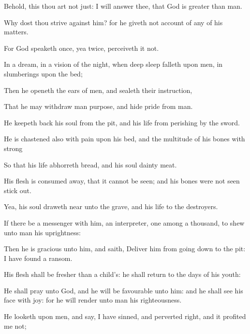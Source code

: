 {Behold,
{} this thou art not
just: I will
answer thee, that
God is
greater than
man.

Why dost thou
strive against him? for he giveth not
account of any of his
matters.


\par }{\PP {}For
God
speaketh
once, yea
twice,
{}
perceiveth it not.

In a
dream, in a
vision of the
night, when
deep sleep
falleth upon
men, in
slumberings upon the
bed;

Then he
openeth the
ears of
men, and
sealeth their
instruction,

That he may
withdraw
man
{}
purpose, and
hide
pride from
man.

He keepeth
back his
soul from the
pit, and his
life from
perishing by the
sword.


\par }{\PP {}He is
chastened also with
pain upon his
bed, and the
multitude of his
bones with
strong
{}

So that his
life
abhorreth
bread, and his
soul
dainty
meat.

His
flesh is consumed
away, that it cannot be
seen; and his
bones
{} were not
seen stick
out.

Yea, his
soul draweth
near unto the
grave, and his
life to the
destroyers.

If
there be a
messenger with him, an
interpreter,
one among a
thousand, to
shew unto
man his
uprightness:

Then he is
gracious unto him, and
saith,
Deliver him from going
down to the
pit: I have
found a
ransom.

His
flesh shall be
fresher than a
child’s: he shall
return to the
days of his
youth:

He shall
pray unto
God, and he will be
favourable unto him: and he shall
see his
face with
joy: for he will
render unto
man his
righteousness.

He
looketh upon
men, and
{}
say, I have
sinned, and
perverted
{}
right, and it
profited me not;

}
